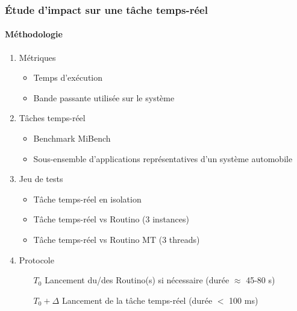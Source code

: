 
\begin{frame}
  \frametitle{\'Etude d'impact sur une tâche temps-réel}
  \framesubtitle{Méthodologie}
  \begin{enumerate}
  \item<1-> Métriques
    \begin{itemize}
    \item Temps d'exécution
    \item Bande passante utilisée sur le système
    \end{itemize}
  \item<2-> Tâches temps-réel
    \begin{itemize}
    \item Benchmark MiBench
    \item Sous-ensemble d'applications représentatives d'un système automobile
    \end{itemize}
  \item<3-> Jeu de tests
    \begin{itemize}
    \item Tâche temps-réel en isolation
    \item Tâche temps-réel vs Routino (3 instances)
    \item Tâche temps-réel vs Routino MT (3 threads)
    \end{itemize}
  \item<4> Protocole
    \begin{itemize}
    \item[$T_0$] Lancement du/des Routino(s) si nécessaire (durée $\approx$
      45-80 s)
    \item[$T_0+\Delta$] Lancement de la tâche temps-réel (durée $<$ 100 ms)
    \end{itemize}
  \end{enumerate}
\end{frame}


